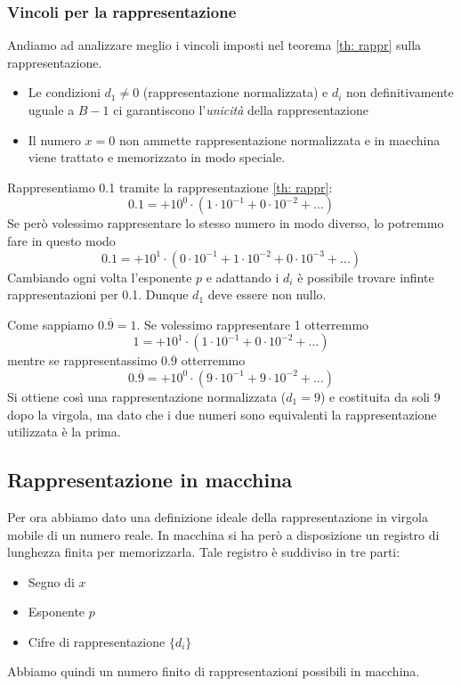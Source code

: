 \subsubsection{Vincoli per la rappresentazione}
Andiamo ad analizzare meglio i vincoli imposti nel teorema \ref{th: rappr} sulla rappresentazione.
\begin{itemize}
	\item Le condizioni $d_1 \neq 0$ (rappresentazione normalizzata) e $d_i$ non definitivamente uguale a
	      $B - 1$ ci garantiscono l'\emph{unicità} della rappresentazione
	\item Il numero $x = 0$ non ammette rappresentazione normalizzata e in macchina viene trattato e
	      memorizzato in modo speciale.
\end{itemize}

\begin{example}
	Rappresentiamo 0.1 tramite la rappresentazione \ref{th: rappr}:
	\[ 0.1 = + 10^0 \cdot (1 \cdot 10^{-1} + 0 \cdot 10^{-2} + \dots) \]
	Se però volessimo rappresentare lo stesso numero in modo diverso, lo potremmo fare in questo modo
	\[ 0.1 = + 10^1 \cdot (0 \cdot 10^{-1} + 1 \cdot 10^{-2} + 0 \cdot 10^{-3} + \dots) \]
	Cambiando ogni volta l'esponente $p$ e adattando i $d_i$ è possibile trovare infinte rappresentazioni
	per 0.1. Dunque $d_1$ deve essere non nullo.
\end{example}

\begin{example}
	Come sappiamo $0.\overline{9} = 1$. Se volessimo rappresentare 1 otterremmo
	\[ 1 = + 10^1 \cdot (1 \cdot 10^{-1} + 0 \cdot 10^{-2} + \dots) \]
	mentre se rappresentassimo $0.\overline{9}$ otterremmo
	\[ 0.\overline{9} = + 10^0 \cdot (9 \cdot 10^{-1} + 9 \cdot 10^{-2} + \dots) \]
	Si ottiene così una rappresentazione normalizzata ($d_1 = 9$) e costituita da soli 9 dopo la virgola,
	ma dato che i due numeri sono equivalenti la rappresentazione utilizzata è la prima.
\end{example}

\subsection{Rappresentazione in macchina}
Per ora abbiamo dato una definizione ideale della rappresentazione in virgola mobile di un numero reale.
In macchina si ha però a disposizione un registro di lunghezza finita per memorizzarla. Tale registro è
suddiviso in tre parti:
\begin{itemize}
	\item Segno di $x$
	\item Esponente $p$
	\item Cifre di rappresentazione $\{ d_i \}$
\end{itemize}
Abbiamo quindi un numero finito di rappresentazioni possibili in macchina.

